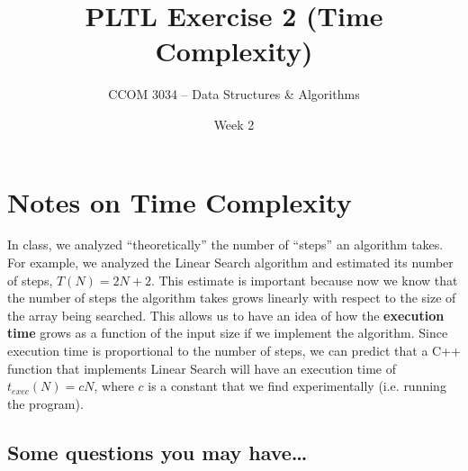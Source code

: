 \documentclass[11 pt]{article}
\title{PLTL Exercise 2 (Time Complexity)}
\author{CCOM 3034 – Data Structures \& Algorithms}
\date{Week 2}
\begin{document}
\maketitle

\section{Notes on Time Complexity}

In class, we analyzed ``theoretically'' the number of ``steps'' an algorithm takes. For example, we analyzed the Linear Search algorithm and estimated its number of steps, $T(N) = 2N + 2$. This estimate is important because now we know that the number of steps the algorithm takes grows linearly with respect to the size of the array being searched. This allows us to have an idea of how the \textbf{execution time} grows as a function of the input size if we implement the algorithm. Since execution time is proportional to the number of steps, we can predict that a C++ function that implements Linear Search will have an execution time of $t_{exec}(N) = c N$, where $c$ is a constant that we find experimentally (i.e. running the program).

\subsection{Some questions you may have\dots}
\end{document}
